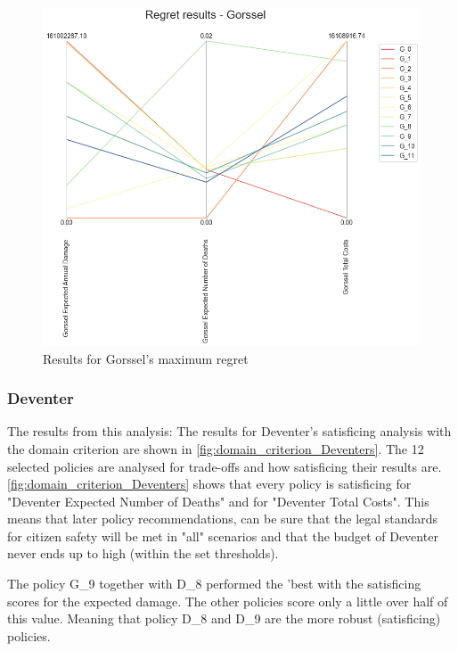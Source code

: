 \begin{figure}[H]
\begin{minipage}[b]{0.4\textwidth}
    \includegraphics[width=1.15\textwidth]{report/figures/results/regret_figure_Gorssel.png}
    \caption{Results for Gorssel's maximum regret}
    \label{fig:regret_gorssel}
  \end{minipage}
\end{figure}




\subsubsection{Deventer}
The results from this analysis: The results for Deventer's satisficing analysis with the domain criterion are shown in \autoref{fig:domain_criterion_Deventers}. The 12 selected policies are analysed for trade-offs and how satisficing their results are. \newline
\autoref{fig:domain_criterion_Deventers} shows that every policy is satisficing for "Deventer Expected Number of Deaths" and for "Deventer Total Costs". This means that later policy recommendations, can be sure that the legal standards for citizen safety will be met in "all" scenarios and that the budget of Deventer never ends up to high (within the set thresholds). \newline 

\noindent The policy G\_9 together with D\_8 performed the 'best with the satisficing scores for the expected damage. The other policies score only a little over half of this value. Meaning that policy D\_8 and D\_9 are the more robust (satisficing) policies. \newline

